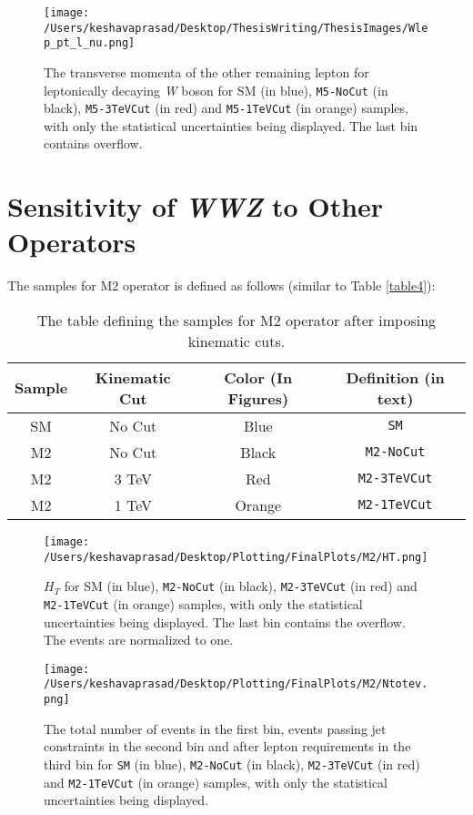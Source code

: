 \begin{figure}[!h]
	\centering
	\texttt{[image: /Users/keshavaprasad/Desktop/ThesisWriting/ThesisImages/Wlep\_pt\_l\_nu.png]}
	\caption{The transverse momenta of the other remaining lepton for leptonically decaying \textit{W} boson for SM (in blue), \texttt{M5-NoCut} (in black), \texttt{M5-3TeVCut} (in red) and \texttt{M5-1TeVCut} (in orange) samples, with only the statistical uncertainties being displayed. The last bin contains overflow.}
	\label{Wlep-pT}
\end{figure}

\section{Sensitivity of \textit{WWZ} to Other Operators}\label{AdditionalPlots}

The samples for M2 operator is defined as follows (similar to Table \ref{table4}):

\begin{table}
	\centering
	\begin{tabular}{|c|c|c|c|}
		\hline
		Sample & Kinematic Cut & Color (In Figures) & Definition (in text)\\
		\hline \hline
		SM & No Cut & Blue & \texttt{SM}\\
		\hline
		M2 & No Cut & Black & \texttt{M2-NoCut} \\
		\hline
		M2 & 3 TeV & Red & \texttt{M2-3TeVCut}\\
		\hline
		M2 & 1 TeV & Orange & \texttt{M2-1TeVCut} \\
		\hline
	\end{tabular}
	\caption{The table defining the samples for M2 operator after imposing kinematic cuts.}
	\label{table5}
\end{table}
\begin{figure}[!htb]
	\centering
	\texttt{[image: /Users/keshavaprasad/Desktop/Plotting/FinalPlots/M2/HT.png]}
	\caption{$H_{T}$ for SM (in blue), \texttt{M2-NoCut} (in black), \texttt{M2-3TeVCut} (in red) and \texttt{M2-1TeVCut} (in orange)  samples, with only the statistical uncertainties being displayed. The last bin contains the overflow. The events are normalized to one.}
	\label{M2-HT}
\end{figure}

\begin{figure}[!htb]
	\centering
	\texttt{[image: /Users/keshavaprasad/Desktop/Plotting/FinalPlots/M2/Ntotev.png]}
	\caption{The total number of events in the first bin, events passing jet constraints in the second bin and after lepton requirements in the third bin for \texttt{SM} (in blue), \texttt{M2-NoCut} (in black), \texttt{M2-3TeVCut} (in red) and \texttt{M2-1TeVCut} (in orange) samples, with only the statistical uncertainties being displayed.}
	\label{M2Cut flow Histogram-PostCuts}
\end{figure}

